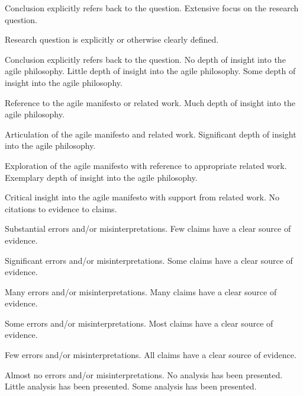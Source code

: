 \documentclass{../fal_assignment}
\begin{document}
\begin{markingrubric}
            \par 		Conclusion explicitly refers back to the question.
        \grade 		Extensive focus on the research question.
            \par 		Research question is explicitly or otherwise clearly defined.
            \par 		Conclusion explicitly refers back to the question.
%
        \grade\fail 	No depth of insight into the agile philosophy.
        \grade 		Little depth of insight into the agile philosophy.
        \grade 		Some depth of insight into the agile philosophy.
        \par 		Reference to the agile manifesto or related work.
        \grade 		Much depth of insight into the agile philosophy.
        \par 		Articulation of the agile manifesto and related work.
        \grade 		Significant depth of insight into the agile philosophy.
        \par 		Exploration of the agile manifesto with reference to appropriate related work.
        \grade 		Exemplary depth of insight into the agile philosophy.
        \par 		Critical insight into the agile manifesto with support from related work.
%
        \grade\fail 	No citations to evidence to claims.
        \par 		Substantial errors and/or misinterpretations.
        \grade 		Few claims have a clear source of evidence.
        \par 		Significant errors and/or misinterpretations.
        \grade 		Some claims have a clear source of evidence.
        \par 		Many errors and/or misinterpretations.
        \grade 		Many claims have a clear source of evidence.
        \par 		Some errors and/or misinterpretations.
        \grade 		Most claims have a clear source of evidence.
        \par 		Few errors and/or misinterpretations.
        \grade 		All claims have a clear source of evidence.
        \par 		Almost no errors and/or misinterpretations.
%
        \grade\fail 	No analysis has been presented.
        \grade 		Little analysis has been presented.
        \grade 		Some analysis has been presented. 

\end{markingrubric}
\end{document}

